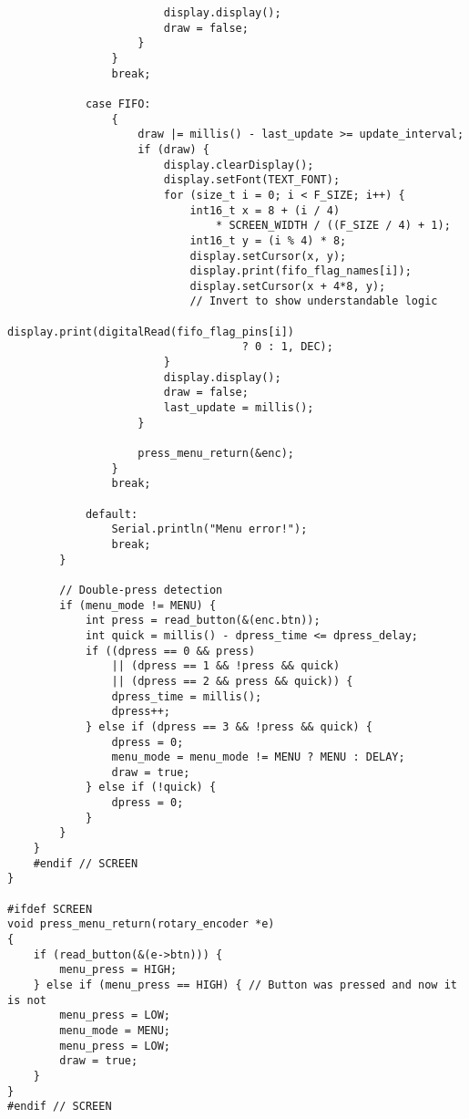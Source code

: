 \documentclass[11pt,letterpaper]{article}
\begin{document}
\begin{verbatim}
                        display.display();
                        draw = false;
                    }
                }
                break;

            case FIFO:
                {
                    draw |= millis() - last_update >= update_interval;
                    if (draw) {
                        display.clearDisplay();
                        display.setFont(TEXT_FONT);
                        for (size_t i = 0; i < F_SIZE; i++) {
                            int16_t x = 8 + (i / 4)
                                * SCREEN_WIDTH / ((F_SIZE / 4) + 1);
                            int16_t y = (i % 4) * 8;
                            display.setCursor(x, y);
                            display.print(fifo_flag_names[i]);
                            display.setCursor(x + 4*8, y);
                            // Invert to show understandable logic
                            display.print(digitalRead(fifo_flag_pins[i])
                                    ? 0 : 1, DEC);
                        }
                        display.display();
                        draw = false;
                        last_update = millis();
                    }

                    press_menu_return(&enc);
                }
                break;

            default:
                Serial.println("Menu error!");
                break;
        }

        // Double-press detection
        if (menu_mode != MENU) {
            int press = read_button(&(enc.btn));
            int quick = millis() - dpress_time <= dpress_delay;
            if ((dpress == 0 && press)
                || (dpress == 1 && !press && quick)
                || (dpress == 2 && press && quick)) {
                dpress_time = millis();
                dpress++;
            } else if (dpress == 3 && !press && quick) {
                dpress = 0;
                menu_mode = menu_mode != MENU ? MENU : DELAY;
                draw = true;
            } else if (!quick) {
                dpress = 0;
            }
        }
    }
    #endif // SCREEN
}

#ifdef SCREEN
void press_menu_return(rotary_encoder *e)
{
    if (read_button(&(e->btn))) {
        menu_press = HIGH;
    } else if (menu_press == HIGH) { // Button was pressed and now it is not
        menu_press = LOW;
        menu_mode = MENU;
        menu_press = LOW;
        draw = true;
    }
}
#endif // SCREEN


\end{verbatim}
\end{document}
